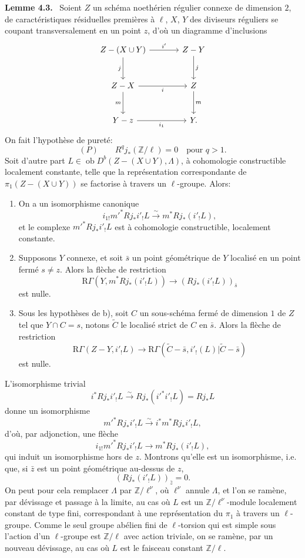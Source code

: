 \documentclass[11pt]{article}
\newenvironment{statement}[1]{\par\medskip\noindent\textbf{#1.}\ }{\par\medskip}
\providecommand{\Ob}{\operatorname{ob}}
\providecommand{\Ob}{\operatorname{ob}}
\providecommand{\Ob}{\operatorname{Ob}}
\begin{document}
\begin{statement}{Lemme 4.3}
Soient $Z$ un schéma noethérien régulier connexe de dimension $2$, de caractéristiques résiduelles premières à $\ell$, $X$, $Y$ des diviseurs réguliers se coupant transversalement en un point $z$, d'où un diagramme d'inclusions
\[
\begin{tikzcd}[column sep=large,row sep=large]
Z-(X\cup Y) \arrow[r,"i'"] \arrow[d,"j"'] & Z-Y \arrow[d,"j"]\\
Z-X \arrow[r,"i"'] \arrow[d,"m"'] & Z \arrow[d,"m"]\\
Y-z \arrow[r,"i_1"'] & Y .
\end{tikzcd}
\]
On fait l'hypothèse de pureté:
\[
(P)\qquad R^qj_*(\mathbb Z/\ell)=0\quad\text{pour }q>1.
\]
Soit d'autre part $L\in\Ob D^b(Z-(X\cup Y),\Lambda)$, à cohomologie constructible localement constante, telle que la représentation correspondante de $\pi_1(Z-(X\cup Y))$ se factorise à travers un $\ell$-groupe. Alors:
\begin{enumerate}[label=\alph*)]
\item On a un isomorphisme canonique
\[
i_{1!}m'^*Rj_*i'_!L\xrightarrow{\sim} m^*Rj_*(i'_!L),
\]
et le complexe $m'^*Rj_*i'_!L$ est à cohomologie constructible, localement constante.
\item Supposons $Y$ connexe, et soit $\bar s$ un point géométrique de $Y$ localisé en un point fermé $s\ne z$. Alors la flèche de restriction
\begin{equation}
\mathrm R\Gamma(Y,m^*Rj_*(i'_!L))\longrightarrow (Rj_*(i'_!L))_{\bar s}
\tag{4.3.1}
\end{equation}
est nulle.
\item Sous les hypothèses de b), soit $C$ un sous-schéma fermé de dimension $1$ de $Z$ tel que $Y\cap C=s$, notons $\widetilde C$ le localisé strict de $C$ en $\bar s$. Alors la flèche de restriction
\begin{equation}
\mathrm R\Gamma(Z-Y,i'_!L)
\longrightarrow
\mathrm R\Gamma(\widetilde C-\bar s,i'_!(L)|\widetilde C-\bar s)
\tag{4.3.2}
\end{equation}
est nulle.
\end{enumerate}
\end{statement}

L'isomorphisme trivial
\[
i^*Rj_*i'_!L\xrightarrow{\sim}Rj_*(i'^*i'_!L)=Rj_*L
\]
donne un isomorphisme
\[
m'^*Rj_*i'_!L\xrightarrow{\sim} i^*m^*Rj_*i'_!L,
\]
d'où, par adjonction, une flèche
\[
i_{1!}m'^*Rj_*i'_!L\longrightarrow m^*Rj_*(i'_!L),
\]
qui induit un isomorphisme hors de $z$. Montrons qu'elle est un isomorphisme, i.e. que, si $\bar z$ est un point géométrique au-dessus de $z$,
\[
(Rj_*(i'_!L))_{\bar z}=0.
\]
On peut pour cela remplacer $\Lambda$ par $\mathbb Z/\ell^\nu$, où $\ell^\nu$ annule $\Lambda$, et l'on se ramène, par dévissage et passage à la limite, au cas où $L$ est un $\mathbb Z/\ell^\nu$-module localement constant de type fini, correspondant à une représentation du $\pi_1$ à travers un $\ell$-groupe. Comme le seul groupe abélien fini de $\ell$-torsion qui est simple sous l'action d'un $\ell$-groupe est $\mathbb Z/\ell$ avec action triviale, on se ramène, par un nouveau dévissage, au cas où $L$ est le faisceau constant $\mathbb Z/\ell$.
\end{document}
